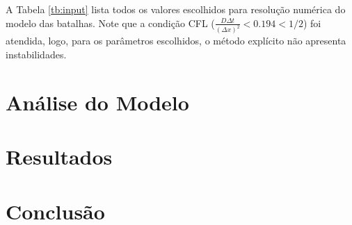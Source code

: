 \documentclass{article}
\begin{document}
A Tabela \ref{tb:input} lista todos os valores escolhidos para resolução numérica do modelo das batalhas. Note que a condição CFL ($\frac{D\Delta t}{(\Delta x)^2} < 0.194 < 1/2$) foi atendida, logo, para os parâmetros escolhidos, o método explícito não apresenta instabilidades.

\section{Análise do Modelo}

\section{Resultados}

\section{Conclusão}





\end{document}
